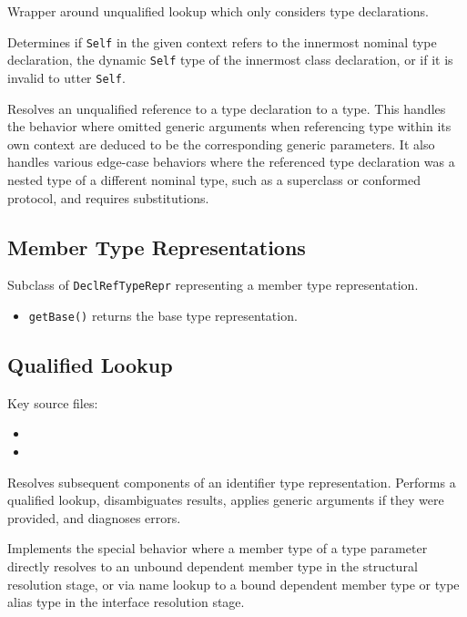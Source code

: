 \documentclass[../generics]{subfiles}
\begin{document}
Wrapper around unqualified lookup which only considers type declarations.

Determines if \texttt{Self} in the given context refers to the innermost nominal type declaration, the dynamic \texttt{Self} type of the innermost class declaration, or if it is invalid to utter \texttt{Self}.

Resolves an unqualified reference to a type declaration to a type. This handles the behavior where omitted generic arguments when referencing type within its own context are deduced to be the corresponding generic parameters. It also handles various edge-case behaviors where the referenced type declaration was a nested type of a different nominal type, such as a superclass or conformed protocol, and requires substitutions.

\subsection*{Member Type Representations}

Subclass of \texttt{DeclRefTypeRepr} representing a member type representation.
\begin{itemize}
\item \texttt{getBase()} returns the base type representation.
\end{itemize}

\subsection*{Qualified Lookup}

Key source files:
\begin{itemize}
\item {}
\item {}
\end{itemize}

Resolves subsequent components of an identifier type representation. Performs a qualified lookup, disambiguates results, applies generic arguments if they were provided, and diagnoses errors.

Implements the special behavior where a member type of a type parameter directly resolves to an unbound dependent member type in the structural resolution stage, or via name lookup to a bound dependent member type or type alias type in the interface resolution stage.
\end{document}
